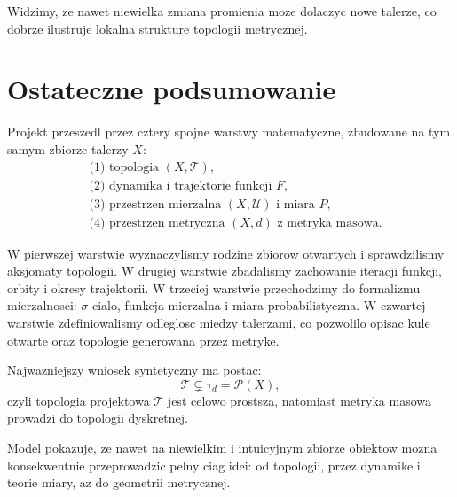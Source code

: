 \documentclass[10pt,a4paper]{article}
\theoremstyle{plain}
\theoremstyle{definition}
\begin{document}
Widzimy, ze nawet niewielka zmiana promienia moze dolaczyc nowe talerze,
co dobrze ilustruje lokalna strukture topologii metrycznej.

\section{Ostateczne podsumowanie}

Projekt przeszedl przez cztery spojne warstwy matematyczne,
zbudowane na tym samym zbiorze talerzy $X$:
\[
\begin{aligned}
&\text{(1) topologia }(X,\mathcal{T}),\\
&\text{(2) dynamika i trajektorie funkcji }F,\\
&\text{(3) przestrzen mierzalna }(X,\mathcal{U})\text{ i miara }P,\\
&\text{(4) przestrzen metryczna }(X,d)\text{ z metryka masowa.}
\end{aligned}
\]

W pierwszej warstwie wyznaczylismy rodzine zbiorow otwartych
i sprawdzilismy aksjomaty topologii. W drugiej warstwie
zbadalismy zachowanie iteracji funkcji, orbity i okresy trajektorii.
W trzeciej warstwie przechodzimy do formalizmu mierzalnosci:
$\sigma$-cialo, funkcja mierzalna i miara probabilistyczna.
W czwartej warstwie zdefiniowalismy odleglosc miedzy talerzami,
co pozwolilo opisac kule otwarte oraz topologie generowana przez metryke.

Najwazniejszy wniosek syntetyczny ma postac:
\[
\mathcal{T}\subsetneq\tau_d=\mathcal{P}(X),
\]
czyli topologia projektowa $\mathcal{T}$ jest celowo prostsza,
natomiast metryka masowa prowadzi do topologii dyskretnej.

Model pokazuje, ze nawet na niewielkim i intuicyjnym zbiorze obiektow
mozna konsekwentnie przeprowadzic pelny ciag idei:
od topologii, przez dynamike i teorie miary,
az do geometrii metrycznej.
\end{document}
